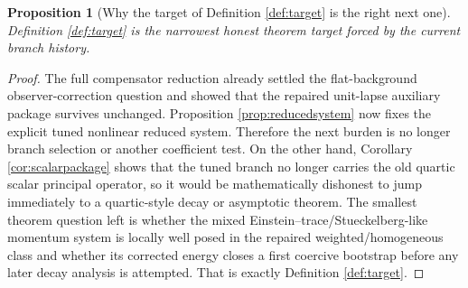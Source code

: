 \documentclass[11pt]{article}
\newtheorem{proposition}{Proposition}
\begin{document}
\begin{proposition}[Why the target of Definition \ref{def:target} is the right next one]
\label{prop:target}
Definition \ref{def:target} is the narrowest honest theorem target forced by the current branch history.
\end{proposition}

\begin{proof}
The full compensator reduction already settled the flat-background observer-correction question and showed that the repaired unit-lapse auxiliary package survives unchanged. Proposition \ref{prop:reducedsystem} now fixes the explicit tuned nonlinear reduced system. Therefore the next burden is no longer branch selection or another coefficient test. On the other hand, Corollary \ref{cor:scalarpackage} shows that the tuned branch no longer carries the old quartic scalar principal operator, so it would be mathematically dishonest to jump immediately to a quartic-style decay or asymptotic theorem. The smallest theorem question left is whether the mixed Einstein--trace/Stueckelberg-like momentum system is locally well posed in the repaired weighted/homogeneous class and whether its corrected energy closes a first coercive bootstrap before any later decay analysis is attempted. That is exactly Definition \ref{def:target}.
\end{proof}
\end{document}
